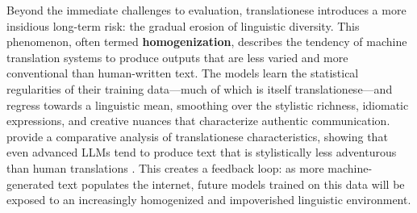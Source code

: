 \documentclass[11pt,a4paper]{article}
\begin{document}
Beyond the immediate challenges to evaluation, translationese introduces a more insidious long-term risk: the gradual erosion of linguistic diversity. This phenomenon, often termed \textbf{homogenization}, describes the tendency of machine translation systems to produce outputs that are less varied and more conventional than human-written text. The models learn the statistical regularities of their training data---much of which is itself translationese---and regress towards a linguistic mean, smoothing over the stylistic richness, idiomatic expressions, and creative nuances that characterize authentic communication. \citet{sizov2024analysing} provide a comparative analysis of translationese characteristics, showing that even advanced LLMs tend to produce text that is stylistically less adventurous than human translations \cite{vanmassenhove2021machine}. This creates a feedback loop: as more machine-generated text populates the internet, future models trained on this data will be exposed to an increasingly homogenized and impoverished linguistic environment.
\end{document}

